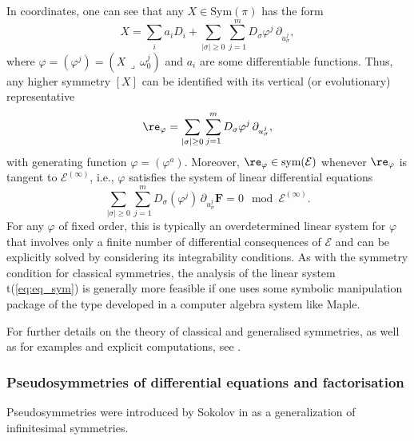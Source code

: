 \documentclass[12pt,english]{elsarticle}
\theoremstyle{plain}
\theoremstyle{plain}
\theoremstyle{remark}
\theoremstyle{plain}
\theoremstyle{definition}
\theoremstyle{definition}
\begin{document}
In coordinates, one can see that any $X\in \text{Sym}(\pi )$ has the form
%
\begin{equation}
X=\sum _{i}a_{i}D_{i}+\sum _{|\sigma |\geq 0}\sum _{j=1}^{m}D_{\sigma}
\varphi ^{j}\,\partial _{u_{\sigma}^{j}},
\label{eq:Sym}
\end{equation}
%
where $\varphi =(\varphi ^{j})=(X\,\lrcorner \,\omega _{0}^{j})$ and
$a_{i}$ are some differentiable functions. Thus, any higher symmetry
$\left [X\right ]$ can be identified with its vertical (or evolutionary)
representative
%
\begin{equation}
\re _{\varphi}=\sum _{|\sigma |\geq 0}\sum _{j=1}^{m}D_{\sigma}
\varphi ^{j}\,\partial _{u_{\sigma}^{j}},
\label{eq:Evol_sym}
\end{equation}
%
with generating function $\varphi =(\varphi ^{a})$. Moreover,
$\re _{\varphi}\in \text{sym}(\mathcal{E})$ whenever $\re _{\varphi}$ is
tangent to $\mathcal{E}^{(\infty )}$, i.e., $\varphi $ satisfies the system
of linear differential equations
%
\begin{equation}
\sum _{|\sigma |\geq 0}\sum _{j=1}^{m}D_{\sigma}(\varphi ^{j})\,
\partial _{u_{\sigma}^{j}}\mathbf{F}=0\mod{\mathcal{E}^{(\infty )}}.
\label{eq:eq_sym}
\end{equation}
%
For any $\varphi $ of fixed order, this is typically an overdetermined
linear system for $\varphi $ that involves only a finite number of differential
consequences of $\mathcal{E}$ and can be explicitly solved by considering
its integrability conditions. As with the symmetry condition for classical
symmetries, the analysis of the linear system t{(\ref{eq:eq_sym})} is generally
more feasible if one uses some symbolic manipulation package of the type
developed in a computer algebra system like Maple.

For further details on the theory of classical and generalised symmetries,
as well as for examples and explicit computations, see
\cite{B_KrV,olver}.



\subsubsection{Pseudosymmetries of differential equations and factorisation}
\label{subsec:Pseudosymmetries}

Pseudosymmetries were introduced by Sokolov in \cite{Sokolov} as a generalization
of infinitesimal symmetries.
\end{document}
